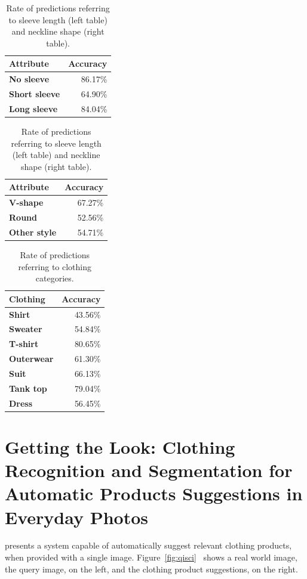 \documentclass[titlepage,12pt,a4paper,times]{book}
\begin{document}
\begin{table}
\centering
\begin{tabular}{|l|r|}
\hline
\textbf{Attribute} & \textbf{Accuracy}\\
\hline
\hline
\textbf{No sleeve} & 86.17\% \\
\hline
\textbf{Short sleeve} & 64.90\% \\
\hline
\textbf{Long sleeve} & 84.04\% \\
\hline
\end{tabular}
\quad
\begin{tabular}{|l|r|}
\hline
\textbf{Attribute} & \textbf{Accuracy}\\
\hline
\hline
\textbf{V-shape} & 67.27\% \\
\hline
\textbf{Round} & 52.56\% \\
\hline
\textbf{Other style} & 54.71\% \\
\hline
\end{tabular}
\caption{Rate of predictions referring to sleeve length (left table) and
neckline shape (right table).}
\label{tab:ropsn}
\end{table}
\FloatBarrier

\begin{table}
\centering
\begin{tabular}{|l|r|}
\hline
\textbf{Clothing} & \textbf{Accuracy}\\
\hline
\hline
\textbf{Shirt} & 43.56\% \\
\hline
\textbf{Sweater} & 54.84\% \\
\hline
\textbf{T-shirt} & 80.65\% \\
\hline
\textbf{Outerwear} & 61.30\% \\
\hline
\textbf{Suit} & 66.13\% \\
\hline
\textbf{Tank top} & 79.04\% \\
\hline
\textbf{Dress} & 56.45\% \\
\hline
\end{tabular}
\caption{Rate of predictions referring to clothing categories.}
\label{tab:ropcc}
\end{table}
\FloatBarrier

\section{Getting the Look: Clothing Recognition and Segmentation for Automatic
Products Suggestions in Everyday Photos}
\label{chap2:sec:art3}
\citep{3} presents a system capable of automatically suggest relevant clothing
products, when provided with a single image. Figure~\ref{fig:qisci}~\citep{3}
shows a real world image, the query image, on the left, and the clothing product
suggestions, on the right.
\end{document}
